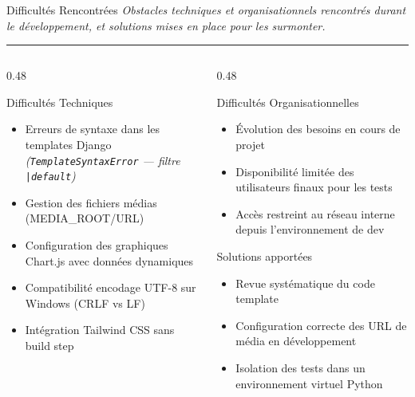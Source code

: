 \documentclass[
  aspectratio=169,       %
  xcolor=dvipsnames,     %
  t                      %
]{beamer}
\newcommand{\framedesc}[1]{%
  {\small\itshape\textcolor{PrimaryDark!80}{#1}}\par%
  \vspace{1pt}%
  {\color{PrimaryMid}\rule{\textwidth}{0.4pt}}%
  \vspace{4pt}%
}
\begin{document}
\begin{frame}{Difficultés Rencontrées}
  \framedesc{Obstacles techniques et organisationnels rencontrés durant le développement, et solutions mises en place pour les surmonter.}

  \begin{columns}[T]

    \begin{column}{0.48\textwidth}
      \begin{alertblock}{Difficultés Techniques}
        \begin{itemize}
          \item Erreurs de syntaxe dans les templates Django\\
                \textit{(\texttt{TemplateSyntaxError} — filtre \texttt{|default})}
          \item Gestion des fichiers médias (MEDIA\_ROOT/URL)
          \item Configuration des graphiques Chart.js avec données dynamiques
          \item Compatibilité encodage UTF-8 sur Windows (CRLF vs LF)
          \item Intégration Tailwind CSS sans build step
        \end{itemize}
      \end{alertblock}
    \end{column}

    \begin{column}{0.48\textwidth}
      \begin{alertblock}{Difficultés Organisationnelles}
        \begin{itemize}
          \item Évolution des besoins en cours de projet
          \item Disponibilité limitée des utilisateurs finaux pour les tests
          \item Accès restreint au réseau interne depuis l'environnement de dev
        \end{itemize}
      \end{alertblock}

      \vspace{0.3cm}

      \begin{block}{Solutions apportées}
        \begin{itemize}
          \item Revue systématique du code template
          \item Configuration correcte des URL de média en développement
          \item Isolation des tests dans un environnement virtuel Python
        \end{itemize}
      \end{block}
    \end{column}

  \end{columns}

\end{frame}
\end{document}
